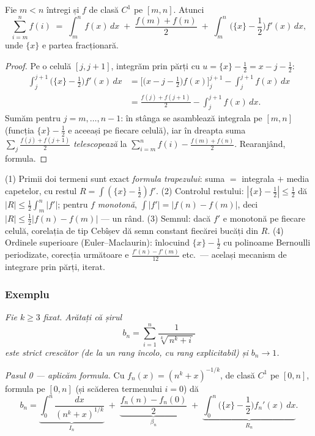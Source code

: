 \begin{teorema}
Fie $m<n$ întregi și $f$ de clasă $C^1$ pe $[m,n]$. Atunci
\[
\sum_{i=m}^{n}f(i)\;=\;\int_m^n f(x)\,dx\;+\;\frac{f(m)+f(n)}{2}\;+\;\int_m^n\Big(\{x\}-\frac12\Big)f'(x)\,dx,
\]
unde $\{x\}$ e partea fracționară.
\end{teorema}
\begin{proof}
Pe o celulă $[j,j+1]$, integrăm prin părți cu $u=\{x\}-\frac12=x-j-\frac12$:
\[
\begin{aligned}
\int_j^{j+1}\Big(\{x\}-\frac12\Big)f'(x)\,dx
&=\Big[\big(x-j-\tfrac12\big)f(x)\Big]_j^{j+1}-\int_j^{j+1}f(x)\,dx\\
&=\frac{f(j)+f(j+1)}{2}-\int_j^{j+1}f(x)\,dx.
\end{aligned}
\]
Sumăm pentru $j=m,\dots,n-1$: în stânga se asamblează integrala pe $[m,n]$ (funcția $\{x\}-\frac12$ e aceeași pe fiecare celulă), iar în dreapta suma $\sum_j\frac{f(j)+f(j+1)}{2}$ \emph{telescopează} la $\sum_{i=m}^nf(i)-\frac{f(m)+f(n)}{2}$. Rearanjând, formula.
\end{proof}

\begin{obs}
(1) Primii doi termeni sunt exact \emph{formula trapezului}: suma $=$ integrala $+$ media capetelor, cu restul $R=\int(\{x\}-\frac12)f'$. (2) Controlul restului: $|\{x\}-\frac12|\le\frac12$ dă $|R|\le\frac12\int_m^n|f'|$; pentru $f$ \emph{monotonă}, $\int|f'|=|f(n)-f(m)|$, deci $|R|\le\frac12|f(n)-f(m)|$ --- un rând. (3) Semnul: dacă $f'$ e monotonă pe fiecare celulă, corelația de tip Cebîșev dă semn constant fiecărei bucăți din $R$. (4) Ordinele superioare (Euler--Maclaurin): înlocuind $\{x\}-\frac12$ cu polinoame Bernoulli periodizate, corecția următoare e $\frac{f'(n)-f'(m)}{12}$ etc.\ --- același mecanism de integrare prin părți, iterat.
\end{obs}

\subsubsection*{Exemplu}

\emph{Fie $k\ge3$ fixat. Arătați că șirul}
\[
b_n=\sum_{i=1}^{n}\frac{1}{\sqrt[k]{\,n^{k}+i\,}}
\]
\emph{este strict crescător (de la un rang încolo, cu rang explicitabil) și $b_n\to1$.}

\emph{Pasul 0 --- aplicăm formula.} Cu $f_n(x)=(n^k+x)^{-1/k}$, de clasă $C^1$ pe $[0,n]$, formula pe $[0,n]$ (și scăderea termenului $i=0$) dă
\[
b_n=\underbrace{\int_0^n\frac{dx}{(n^k+x)^{1/k}}}_{I_n}\;+\;\underbrace{\frac{f_n(n)-f_n(0)}{2}}_{\beta_n}\;+\;\underbrace{\int_0^n\Big(\{x\}-\frac12\Big)f_n'(x)\,dx}_{R_n}.
\]

